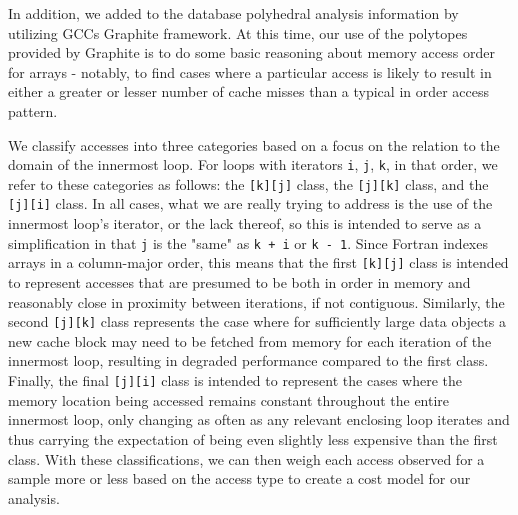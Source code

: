 In addition, we added to the database
polyhedral analysis information by utilizing \acsp{GCC} Graphite framework\cite{trifunovic:inria-00551516}.
At this time, our use of the polytopes provided by Graphite is to do some basic reasoning about memory access order for arrays - notably, to find cases where a particular access is likely to result in either a greater or lesser number of cache misses than a typical in order access pattern.

We classify accesses into three categories based on a focus on the relation to the domain of the innermost loop.
For loops with iterators \texttt{i}, \texttt{j}, \texttt{k}, in that order, we refer to these categories as follows: the \texttt{[k][j]} class, the \texttt{[j][k]} class, and the \texttt{[j][i]} class.
In all cases, what we are really trying to address is the use of the innermost loop's iterator, or the lack thereof, so this is intended to serve as a simplification in that \texttt{j} is the "same" as \texttt{k + i} or \texttt{k - 1}.
Since Fortran indexes arrays in a column-major order, this means that the first \texttt{[k][j]} class is intended to represent accesses that are presumed to be both in order in memory and reasonably close in proximity between iterations, if not contiguous.
Similarly, the second \texttt{[j][k]} class represents the case where for sufficiently large data objects a new cache block may need to be fetched from memory for each iteration of the innermost loop, resulting in degraded performance compared to the first class.
Finally, the final \texttt{[j][i]} class is intended to represent the cases where the memory location being accessed remains constant throughout the entire innermost loop, only changing as often as any relevant enclosing loop iterates and thus carrying the expectation of being even slightly less expensive than the first class.
With these classifications, we can then weigh each access observed for a sample more or less based on the access type to create a cost model for our analysis.%
